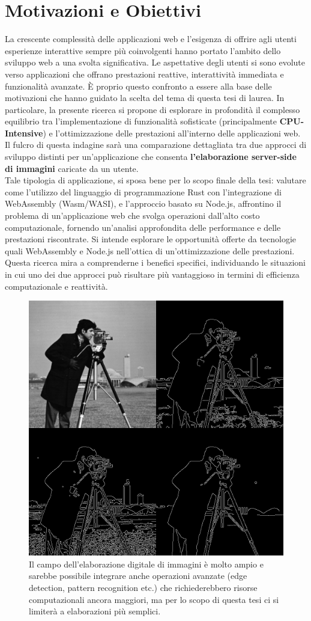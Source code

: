 \section{Motivazioni e Obiettivi}
\label{sec:Obiettivi}
La crescente complessità delle applicazioni web e l'esigenza di offrire agli utenti esperienze interattive sempre più coinvolgenti hanno portato l'ambito dello sviluppo web a una svolta significativa. Le aspettative degli utenti si sono evolute verso applicazioni che offrano prestazioni reattive, interattività immediata e funzionalità avanzate. È proprio questo confronto a essere alla base delle motivazioni che hanno guidato la scelta del tema di questa tesi di laurea.
In particolare, la presente ricerca si propone di esplorare in profondità il complesso equilibrio tra l'implementazione di funzionalità sofisticate (principalmente \textbf{CPU-Intensive}) e l'ottimizzazione delle prestazioni all'interno delle applicazioni web. Il fulcro di questa indagine sarà una comparazione dettagliata tra due approcci di sviluppo distinti per un'applicazione che consenta \textbf{l'elaborazione server-side di immagini} caricate da un utente.
\\Tale tipologia di applicazione, si sposa bene per lo scopo finale della tesi: valutare come l'utilizzo del linguaggio di programmazione Rust con l'integrazione di WebAssembly (Wasm/WASI), e l'approccio basato su Node.js, affrontino il problema di un'applicazione web che svolga operazioni dall'alto costo computazionale, fornendo un'analisi approfondita delle performance e delle prestazioni riscontrate.
Si intende esplorare le opportunità offerte da tecnologie quali WebAssembly e Node.js nell'ottica di un'ottimizzazione delle prestazioni. Questa ricerca mira a comprenderne i benefici specifici, individuando le situazioni in cui uno dei due approcci può risultare più vantaggioso in termini di efficienza computazionale e reattività.
\begin{figure}
        \begin{center}
                \includegraphics[width=0.6\columnwidth]{images/imageProc.jpg}
        \end{center}
        \caption{Il campo dell'elaborazione digitale di immagini è molto ampio e sarebbe possibile integrare anche operazioni avanzate (edge detection, pattern recognition etc.) che richiederebbero risorse computazionali ancora maggiori, ma per lo scopo di questa tesi ci si limiterà a elaborazioni più semplici.}
        \label{fig:spa}
\end{figure}
